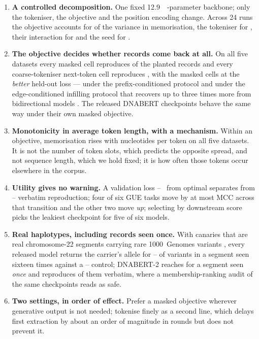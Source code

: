 \begin{enumerate}\itemsep1pt
  \item \textbf{A controlled decomposition.} One fixed \SI{12.9}{\mega\nothing}-parameter backbone;
        only the tokeniser, the objective and the position encoding change. Across 24 runs the
        objective accounts for  of the variance in memorisation, the tokeniser for
        , their interaction for  and the seed for .
  \item \textbf{The objective decides whether records come back at all.} On all five datasets every
        masked cell reproduces  of the planted records and every coarse-tokeniser
        next-token cell reproduces , with the masked cells at the \emph{better} held-out
        loss --- under the prefix-conditioned protocol and under the edge-conditioned infilling
        protocol that recovers up to three times more from bidirectional models
        \cite{wang2026infilling}. The released DNABERT checkpoints behave the same way under their
        own masked objective.
  \item \textbf{Monotonicity in average token length, with a mechanism.} Within an objective,
        memorisation rises with nucleotides per token on all five datasets. It is not the number of
        token slots, which predicts the opposite spread, and not sequence length, which we hold
        fixed; it is how often those tokens occur elsewhere in the corpus.
  \item \textbf{Utility gives no warning.} A validation loss --~\bits{} from
        optimal separates  from -- verbatim reproduction; four of six
        GUE tasks \cite{zhou2024dnabert2} move by at most  MCC across that transition and
        the other two move \emph{up}; selecting by downstream score picks the leakiest checkpoint for
        five of six models.
  \item \textbf{Real haplotypes, including records seen once.} With canaries that are real
        chromosome-22 segments carrying rare 1000~Genomes variants \cite{thousandgenomes2015}, every
        released model returns the carrier's allele for -- of variants in a
        segment seen sixteen times against a -- control; DNABERT-2 reaches
         for a segment seen \emph{once} and reproduces  of them verbatim, where a
        membership-ranking audit of the same checkpoints reads as safe.
  \item \textbf{Two settings, in order of effect.} Prefer a masked objective wherever generative
        output is not needed; tokenise finely as a second line, which delays first extraction by
        about an order of magnitude in rounds but does not prevent it.
\end{enumerate}

